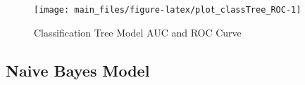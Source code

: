 \begin{Schunk}
\begin{figure}[H]

{\centering \texttt{[image: main\_files/figure-latex/plot\_classTree\_ROC-1]} 

}

\caption[Classification Tree Model AUC and ROC Curve]{Classification Tree Model AUC and ROC Curve}\label{fig:plot_classTree_ROC}
\end{figure}
\end{Schunk}

\hypertarget{naive-bayes-model}{%
\subsection{Naive Bayes Model}\label{naive-bayes-model}}

